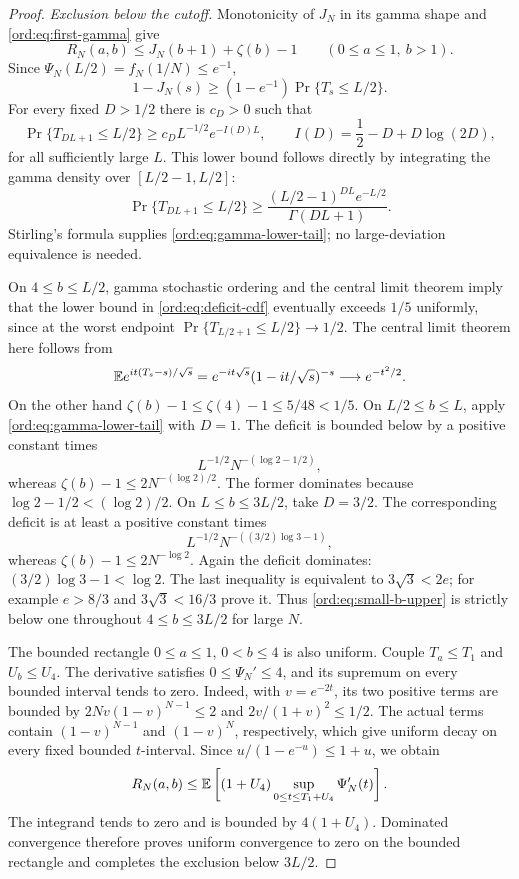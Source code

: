 \begin{proof}
\emph{Exclusion below the cutoff.}
Monotonicity of $J_N$ in its gamma shape and
\eqref{ord:eq:first-gamma} give
\begin{equation}\label{ord:eq:small-b-upper}
 R_N(a,b)\le J_N(b+1)+\zeta(b)-1
       \qquad(0\le a\le1,\ b>1).
\end{equation}
Since $\Psi_N(L/2)=f_N(1/N)\le e^{-1}$,
\begin{equation}\label{ord:eq:deficit-cdf}
 1-J_N(s)\ge(1-e^{-1})
          \Pr\{T_s\le L/2\}.
\end{equation}
For every fixed $D>1/2$ there is $c_D>0$ such that
\begin{equation}\label{ord:eq:gamma-lower-tail}
 \Pr\{T_{DL+1}\le L/2\}
 \ge c_D L^{-1/2}e^{-I(D)L},\qquad
 I(D)=\frac12-D+D\log(2D),
\end{equation}
for all sufficiently large $L$. This lower bound follows directly by
integrating the gamma density over $[L/2-1,L/2]$:
\[
 \Pr\{T_{DL+1}\le L/2\}
 \ge\frac{(L/2-1)^{DL}e^{-L/2}}{\Gamma(DL+1)}.
\]
Stirling's formula \cite[Section 5.11]{DLMF} supplies
\eqref{ord:eq:gamma-lower-tail}; no
large-deviation equivalence is needed.

On $4\le b\le L/2$, gamma stochastic ordering and the central limit
theorem imply that the lower bound in \eqref{ord:eq:deficit-cdf}
eventually exceeds $1/5$ uniformly, since at the worst endpoint
$\Pr\{T_{L/2+1}\le L/2\}\to1/2$. The central limit theorem here follows
from
\[
 \mathbb E e^{it(T_s-s)/\sqrt s}
 =e^{-it\sqrt s}(1-it/\sqrt s)^{-s}\longrightarrow e^{-t^2/2}.
\]
On the other hand $\zeta(b)-1\le\zeta(4)-1\le5/48<1/5$.
On $L/2\le b\le L$, apply \eqref{ord:eq:gamma-lower-tail} with $D=1$.
The deficit is bounded below by a positive constant times
\[
 L^{-1/2}N^{-(\log2-1/2)},
\]
whereas $\zeta(b)-1\le2N^{-(\log2)/2}$. The former dominates because
$\log2-1/2<(\log2)/2$.
On $L\le b\le3L/2$, take $D=3/2$. The corresponding deficit is at least
a positive constant times
\[
 L^{-1/2}N^{-((3/2)\log3-1)},
\]
whereas $\zeta(b)-1\le2N^{-\log2}$. Again the deficit dominates:
$(3/2)\log3-1<\log2$. The last inequality is equivalent to
$3\sqrt3<2e$; for example $e>8/3$ and $3\sqrt3<16/3$ prove it.
Thus \eqref{ord:eq:small-b-upper} is strictly below one throughout
$4\le b\le3L/2$ for large $N$.

The bounded rectangle $0\le a\le1$, $0<b\le4$ is also uniform.
Couple $T_a\le T_1$ and $U_b\le U_4$. The derivative satisfies
$0\le\Psi_N'\le4$, and its supremum on every bounded interval tends
to zero. Indeed, with $v=e^{-2t}$, its two positive terms are bounded
by $2Nv(1-v)^{N-1}\le2$ and $2v/(1+v)^2\le1/2$.
The actual terms contain $(1-v)^{N-1}$ and $(1-v)^N$, respectively,
which give uniform decay on every fixed bounded $t$-interval.
Since $u/(1-e^{-u})\le1+u$, we obtain
\[
 R_N(a,b)\le\mathbb E\left[(1+U_4)
          \sup_{0\le t\le T_1+U_4}\Psi_N'(t)\right].
\]
The integrand tends to zero and is bounded by $4(1+U_4)$.
Dominated convergence therefore proves uniform convergence to zero on
the bounded rectangle and completes the exclusion below $3L/2$.


\end{proof}
